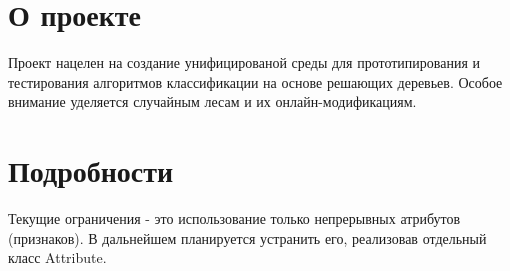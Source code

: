 \hypertarget{index_intro_sec}{}\section{О проекте}\label{index_intro_sec}
Проект нацелен на создание унифицированой среды для прототипирования и тестирования алгоритмов классификации на основе решающих деревьев. Особое внимание уделяется случайным лесам и их онлайн-\/модификациям.\hypertarget{index_details_sec}{}\section{Подробности}\label{index_details_sec}
Текущие ограничения -\/ это использование только непрерывных атрибутов (признаков). В дальнейшем планируется устранить его, реализовав отдельный класс Attribute. 